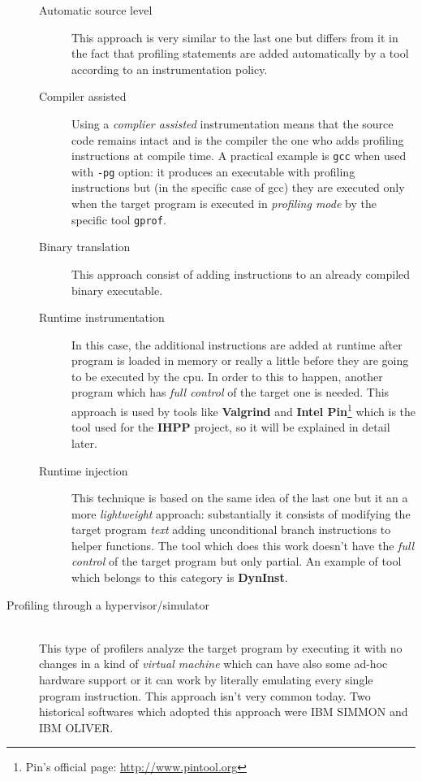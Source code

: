 \documentclass[a4paper,11pt]{report}
\begin{document}
\begin{description}
\begin{description}
\item[Automatic source level] This approach is very similar to the last one but
differs from it in the fact that profiling statements are added automatically by
a tool according to an instrumentation policy.

\item[Compiler assisted] Using a \emph{complier assisted} instrumentation means
that the source code remains intact and is the compiler the one who adds
profiling instructions at compile time. A practical example is \verb|gcc| when
used with \verb|-pg| option: it produces an executable with profiling
instructions but (in the specific case of gcc) they are executed only when the
target program is executed in \emph{profiling mode} by the specific tool
\verb|gprof|.

\item[Binary translation]
This approach consist of adding instructions to an already compiled binary executable.

\item[Runtime instrumentation]
In this case, the additional instructions are added at runtime after program is
loaded in memory or really a little before they are going to be executed by the
cpu. In order to this to happen, another program which has \emph{full control}
of the target one is needed. This approach is used by tools like
\textbf{Valgrind} and \textbf{Intel Pin}\footnote{Pin's official page:
\url{http://www.pintool.org}} which is the tool used for the \textbf{IHPP}
project, so it will be explained in detail later.

\item[Runtime injection] This technique is based on the same idea of the last
one but it an a more \emph{lightweight} approach: substantially it consists of
modifying the target program \emph{text} adding unconditional branch
instructions to helper functions. The tool which does this work doesn't have the
\emph{full control} of the target program but only partial. An example of tool
which belongs to this category is \textbf{DynInst}.

\end{description} 

\item[Profiling through a hypervisor/simulator] \hfill \\
This type of profilers analyze the target program by executing it with no
changes in a kind of \emph{virtual machine} which can have also some ad-hoc
hardware support or it can work by literally emulating every single program
instruction. This approach isn't very common today. Two historical softwares
which adopted this approach were IBM SIMMON and IBM OLIVER.

\end{description}
\end{document}
